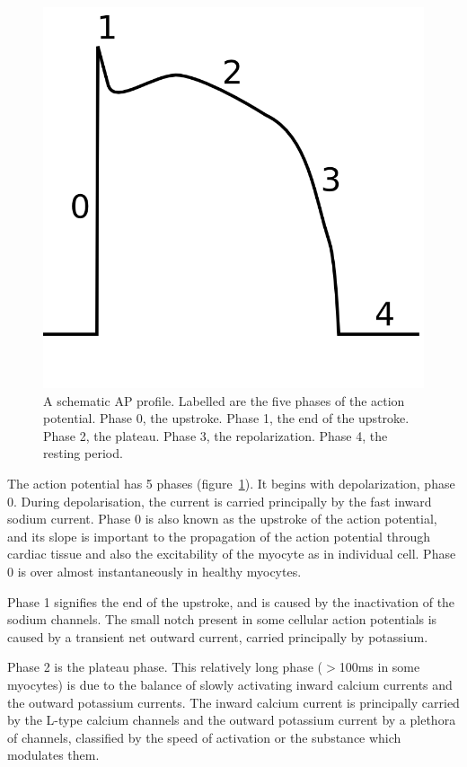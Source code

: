 \begin{figure}
\begin{center}
\includegraphics{figures/intro/ap_profile}
\end{center}
\caption[Schematic AP Profile]{
\label{fig:intro:heart:ap}
A schematic AP profile.
Labelled are the five phases of the action potential.
Phase 0, the upstroke.
Phase 1, the end of the upstroke.
Phase 2, the plateau.
Phase 3, the repolarization.
Phase 4, the resting period.
}
\end{figure}

The action potential has 5 phases (figure~\ref{fig:intro:heart:ap}).
It begins with depolarization, phase 0.
During depolarisation, the current is carried principally by the fast inward
sodium current.
Phase 0 is also known as the upstroke of the action potential, and its slope is
important to the propagation of the action potential through cardiac tissue and
also the excitability of the myocyte as in individual cell.
Phase 0 is over almost instantaneously in healthy myocytes.

Phase 1 signifies the end of the upstroke, and is caused by the inactivation of
the sodium channels.
The small notch present in some cellular action potentials is caused by a
transient net outward current, carried principally by potassium.

Phase 2 is the plateau phase.  This relatively long phase ($>$100ms in some
myocytes) is due to the balance of slowly activating inward calcium currents and
the outward potassium currents.
The inward calcium current is principally carried by the L-type calcium channels
and the outward potassium current by a plethora of channels, classified by the
speed of activation or the substance which modulates them.

